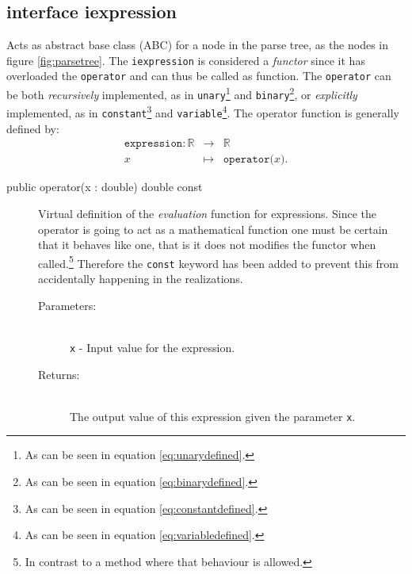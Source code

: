 \documentclass[a4paper,11pt]{kth-mag}
\newcommand{\RR}{\ensuremath{\mathbb{R}}}
\begin{document}
\subsection{interface iexpression}
\label{sec:iexpression}
Acts as abstract base class (ABC) for a node in the parse
tree, as the nodes in figure \ref{fig:parsetree}. The
\texttt{iexpression} is considered a \emph{functor} since it has overloaded the
\texttt{operator} and can thus be called as function.
The \texttt{operator} can be both 
\emph{recursively} implemented, as in
    \texttt{unary}\footnote{As can be seen in equation \ref{eq:unarydefined}.} 
    and
    \texttt{binary}\footnote{As can be seen in equation \ref{eq:binarydefined}.}, or
\emph{explicitly} implemented, as in 
    \texttt{constant}\footnote{As can be seen in equation \ref{eq:constantdefined}.} 
    and
    \texttt{variable}\footnote{As can be seen in equation \ref{eq:variabledefined}.}.
The operator function is generally defined by:
\begin{eqnarray}
    \label{eq:expressiondefined}
    \texttt{expression}: \RR &\rightarrow& \RR \nonumber \\
    x &\mapsto& \texttt{operator(}x\texttt{)} .
\end{eqnarray}

\begin{description}
    \item[public operator(x : double) double const] 
    Virtual definition of the \emph{evaluation} function for expressions. 
    Since the operator is going to act as a mathematical function one must be certain
    that it behaves like one, that is it does not modifies the functor when
    called.\footnote{In contrast to a method where that behaviour is allowed.}
    Therefore the \texttt{const} keyword has been added to prevent this
    from accidentally happening in the realizations.
    \begin{description}
        \item[Parameters:]~\\
            \verb+x+ - Input value for the expression. 
        \item[Returns:]~\\
            The output value of this expression given the parameter \texttt{x}.
    \end{description}
\end{description}
\end{document}
